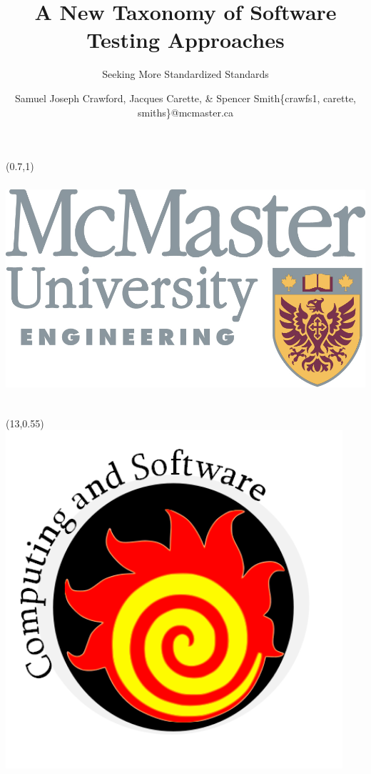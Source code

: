 \documentclass[22pt]{beamer}
\title{A New Taxonomy of Software Testing Approaches}
\subtitle{Seeking More Standardized Standards}
\author[Crawford, Carette, \& Smith]{Samuel Joseph Crawford, Jacques Carette,
    \& Spencer Smith\newline \small \{crawfs1, carette, smiths\}@mcmaster.ca}
\institute{\fontsize{26}{12}\selectfont \today} %
\date{}
\begin{document}

\begin{frame}[fragile]

    \begin{textblock}{2}(0.7,1)
        \includegraphics[height=8.5cm]{eng_logo.png}
    \end{textblock}

    \begin{textblock}{2}(13,0.55)
        \includegraphics[height=12.5cm]{cas_logo.png}
    \end{textblock}


\end{frame}
\end{document}
